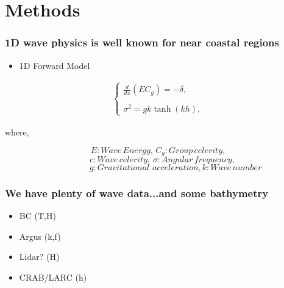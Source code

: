 \documentclass[7pt]{beamer}
\begin{document}
\section{Methods}
\begin{frame}
 \frametitle{1D wave physics is well known for near coastal regions}
\centering
\begin{itemize}
\item 1D Forward Model
\end{itemize}

\begin{eqnarray*}
\label{fp1}
\left \{
\begin{array}{lll}
\frac{d}{dx}\left(EC_g\right)=-\delta,\\
\\
\sigma^2=gk\tanh(kh),
\label{ode}
\end{array}
\right.
\end{eqnarray*}
\begin{flushleft}
where,
\end{flushleft}
$${E: Wave \,Energy,\, C_{g}: Group \,celerity,}$$
$${\quad c: Wave \,celerity,\, \sigma: Angular \,frequency,}$$
$${\quad\quad\quad\quad g: Gravitational\,\, acceleration,k: Wave \,number}$$
\end{frame}

\begin{frame}
 \frametitle{We have plenty of wave data...and some bathymetry}

\begin{itemize}
\item BC (T,H)
\item Argus (k,f)
\item Lidar? (H)
\item CRAB/LARC (h)
\end{itemize}


\end{frame}
\end{document}
